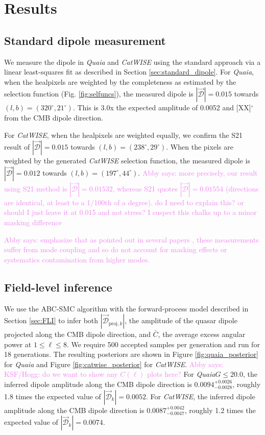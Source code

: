 \documentclass[modern]{aastex631}
\newcommand{\abby}[1]{\textcolor{violet}{Abby says: #1}}
\newcommand{\catwise}{\textsl{CatWISE}\xspace}
\newcommand{\quaia}{\textsl{Quaia}\xspace}
\newcommand{\dipamp}{|\vec{\mathcal{D}}_k|}
\begin{document}
\section{Results}
\label{sec:results}

\subsection{Standard dipole measurement}
\label{sec:standard_results}

We measure the dipole in \quaia and \catwise using the standard approach via a linear least-squares fit as described in Section \ref{sec:standard_dipole}.
For \quaia, when the healpixels are weighted by the completeness as estimated by the selection function (Fig. \ref{fig:selfuncs}), the measured dipole is $|\vec{\mathcal{D}}|=0.015$ towards $(l,b)=(320^\circ,21^\circ)$.
This is 3.0x the expected amplitude of 0.0052 and [XX]$^\circ$ from the CMB dipole direction.

For \catwise, when the healpixels are weighted equally, we confirm the S21 result of $|\vec{\mathcal{D}}|=0.015$ towards $(l,b)=(238^\circ,29^\circ)$.
When the pixels are weighted by the generated \catwise selection function, the measured dipole is $|\vec{\mathcal{D}}|=0.012$ towards $(l,b)=(197^\circ,44^\circ)$.
\abby{more precisely, our result using S21 method is $|\vec{\mathcal{D}}|=0.01532$, whereas S21 quotes $|\vec{\mathcal{D}}|=0.01554$ (directions are identical, at least to a 1/100th of a degree). do I need to explain this? or should I just leave it at 0.015 and not stress? I suspect this chalks up to a minor masking difference}

\abby{emphasize that as pointed out in several papers \citep{abghari_reassessment_2024, lizancos_impact_2023}, these measurements suffer from mode coupling and so do not account for masking effects or systematics contamination from higher modes.}

\subsection{Field-level inference}
\label{sec:fbi_results}
We use the ABC-SMC algorithm with the forward-process model described in Section \ref{sec:FLI} to infer both $|\vec{\mathcal{D}}_{\mathrm{proj},k}|$, the amplitude of the quasar dipole projected along the CMB dipole direction, and $\bar C$, the average excess angular power at $1\le\ell\le 8$.
We require 500 accepted samples per generation and run for 18 generations.
The resulting posteriors are shown in Figure \ref{fig:quaia_posterior} for \quaia and Figure \ref{fig:catwise_posterior} for \catwise.
\abby{KSF/Hogg: do we want to show any $C(\ell)$ plots here?}
For \quaia $G\le 20.0$, the inferred dipole amplitude along the CMB dipole direction is $0.0094^{+0.0026}_{-0.0028}$, roughly 1.8 times the expected value of $\dipamp=0.0052$.
For \catwise, the inferred dipole amplitude along the CMB dipole direction is $0.0087^{+0.0042}_{-0.0047}$, roughly 1.2 times the expected value of $\dipamp=0.0074$.
\end{document}
